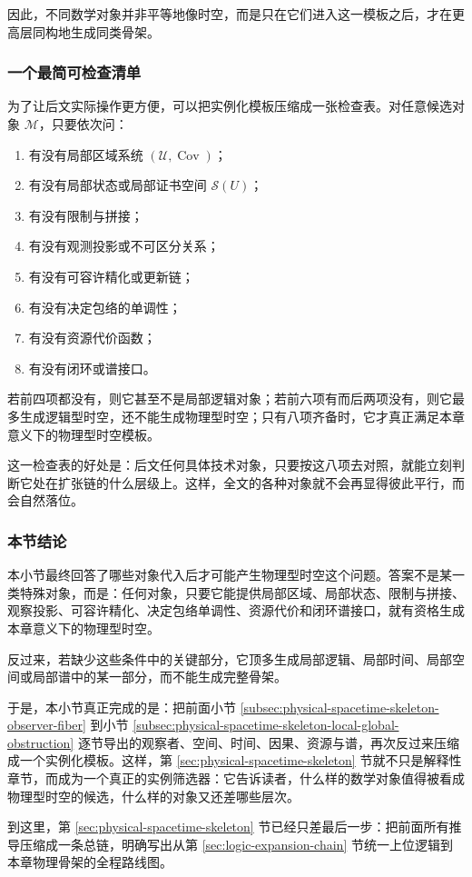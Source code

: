 因此，不同数学对象并非平等地像时空，而是只在它们进入这一模板之后，才在更高层同构地生成同类骨架。

\subsubsection{一个最简可检查清单}

为了让后文实际操作更方便，可以把实例化模板压缩成一张检查表。对任意候选对象 \(\mathcal M\)，只要依次问：
\begin{enumerate}
  \item 有没有局部区域系统 \((\mathcal U,\operatorname{Cov})\)；
  \item 有没有局部状态或局部证书空间 \(\mathcal S(U)\)；
  \item 有没有限制与拼接；
  \item 有没有观测投影或不可区分关系；
  \item 有没有可容许精化或更新链；
  \item 有没有决定包络的单调性；
  \item 有没有资源代价函数；
  \item 有没有闭环或谱接口。
\end{enumerate}

若前四项都没有，则它甚至不是局部逻辑对象；若前六项有而后两项没有，则它最多生成逻辑型时空，还不能生成物理型时空；只有八项齐备时，它才真正满足本章意义下的物理型时空模板。

这一检查表的好处是：后文任何具体技术对象，只要按这八项去对照，就能立刻判断它处在扩张链的什么层级上。这样，全文的各种对象就不会再显得彼此平行，而会自然落位。

\subsubsection{本节结论}

本小节最终回答了哪些对象代入后才可能产生物理型时空这个问题。答案不是某一类特殊对象，而是：任何对象，只要它能提供局部区域、局部状态、限制与拼接、观察投影、可容许精化、决定包络单调性、资源代价和闭环谱接口，就有资格生成本章意义下的物理型时空。

反过来，若缺少这些条件中的关键部分，它顶多生成局部逻辑、局部时间、局部空间或局部谱中的某一部分，而不能生成完整骨架。

于是，本小节真正完成的是：把前面小节 \ref{subsec:physical-spacetime-skeleton-observer-fiber} 到小节 \ref{subsec:physical-spacetime-skeleton-local-global-obstruction} 逐节导出的观察者、空间、时间、因果、资源与谱，再次反过来压缩成一个实例化模板。这样，第 \ref{sec:physical-spacetime-skeleton} 节就不只是解释性章节，而成为一个真正的实例筛选器：它告诉读者，什么样的数学对象值得被看成物理型时空的候选，什么样的对象又还差哪些层次。

到这里，第 \ref{sec:physical-spacetime-skeleton} 节已经只差最后一步：把前面所有推导压缩成一条总链，明确写出从第 \ref{sec:logic-expansion-chain} 节统一上位逻辑到本章物理骨架的全程路线图。
